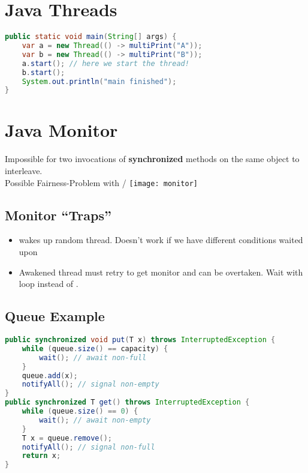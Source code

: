 

\newcommand{\TITLE}{Parallel Programming}
\newcommand{\AUTHOR}{Mona Panchaud}
\newcommand{\INSTITUTE}{Ostschweizer Fachhochschule}


\begin{multicols*}{4}

\section{Java Threads}
    \begin{lstlisting}[language=java]
public static void main(String[] args) {
    var a = new Thread(() -> multiPrint("A"));
    var b = new Thread(() -> multiPrint("B"));
    a.start(); // here we start the thread!
    b.start();
    System.out.println("main finished");
}
\end{lstlisting}

\section{Java Monitor}
    Impossible for two invocations of \textbf{synchronized} methods on the same object to interleave.\\
    Possible Fairness-Problem with /
    \texttt{[image: monitor]}
    \subsection{Monitor ``Traps''}
        \begin{itemize}
            \item {} wakes up random thread. Doesn't work if we have different conditions waited upon
            \item Awakened thread must retry to get monitor and can be overtaken. Wait with  loop instead of .
        \end{itemize}

    \subsection{Queue Example}
    \begin{lstlisting}[language=java]
public synchronized void put(T x) throws InterruptedException {
    while (queue.size() == capacity) {
        wait(); // await non-full
    }
    queue.add(x);
    notifyAll(); // signal non-empty
}
public synchronized T get() throws InterruptedException {
    while (queue.size() == 0) {
        wait(); // await non-empty
    }
    T x = queue.remove();
    notifyAll(); // signal non-full
    return x;
}
\end{lstlisting}


\end{multicols*}

